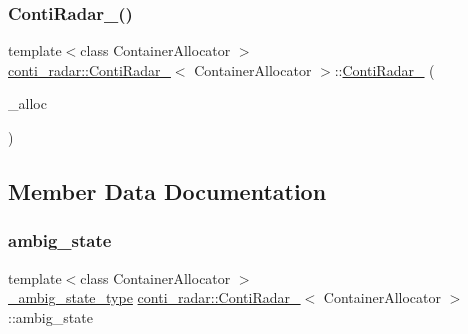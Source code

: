 \subsubsection{\texorpdfstring{Conti\+Radar\+\_\+()}{ContiRadar\_()}\hspace{0.1cm}{\footnotesize\ttfamily [2/2]}}
{\footnotesize\ttfamily template$<$class Container\+Allocator $>$ \\
\hyperlink{structconti__radar_1_1ContiRadar__}{conti\+\_\+radar\+::\+Conti\+Radar\+\_\+}$<$ Container\+Allocator $>$\+::\hyperlink{structconti__radar_1_1ContiRadar__}{Conti\+Radar\+\_\+} (\begin{DoxyParamCaption}\item[{const Container\+Allocator \&}]{\+\_\+alloc }\end{DoxyParamCaption})\hspace{0.3cm}{\ttfamily [inline]}}



\subsection{Member Data Documentation}
\mbox{\label{structconti__radar_1_1ContiRadar___a0ffefdeb29b98362f221ac2d787265eb}} 
\subsubsection{\texorpdfstring{ambig\+\_\+state}{ambig\_state}}
{\footnotesize\ttfamily template$<$class Container\+Allocator $>$ \\
\hyperlink{structconti__radar_1_1ContiRadar___a193834825a012bc4ef64220db985d2eb}{\+\_\+ambig\+\_\+state\+\_\+type} \hyperlink{structconti__radar_1_1ContiRadar__}{conti\+\_\+radar\+::\+Conti\+Radar\+\_\+}$<$ Container\+Allocator $>$\+::ambig\+\_\+state}

\mbox{\label{structconti__radar_1_1ContiRadar___aa218a3655575785cf14052b9f41eb53e}} 
